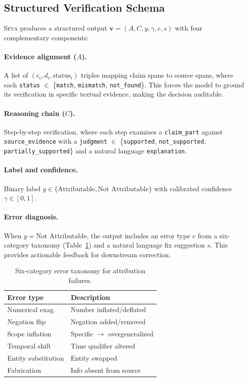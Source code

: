 \documentclass[11pt]{article}
\newcommand{\seva}{\textsc{Seva}\xspace}
\begin{document}
\subsection{Structured Verification Schema}
\label{sec:format}

\seva produces a structured output $\mathbf{v} = (A, C, y, \gamma, e, s)$ with four complementary components:

\paragraph{Evidence alignment ($A$).}
A list of $(c_i, d_i, \text{status}_i)$ triples mapping claim spans to source spans, where each \texttt{status} $\in$ \{\texttt{match}, \texttt{mismatch}, \texttt{not\_found}\}.
This forces the model to ground its verification in specific textual evidence, making the decision auditable.

\paragraph{Reasoning chain ($C$).}
Step-by-step verification, where each step examines a \texttt{claim\_part} against \texttt{source\_evidence} with a \texttt{judgment} $\in$ \{\texttt{supported}, \texttt{not\_supported}, \texttt{partially\_supported}\} and a natural language \texttt{explanation}.

\paragraph{Label and confidence.}
Binary label $y \in \{\text{Attributable}, \text{Not Attributable}\}$ with calibrated confidence $\gamma \in [0,1]$.

\paragraph{Error diagnosis.}
When $y = \text{Not Attributable}$, the output includes an error type $e$ from a six-category taxonomy (Table~\ref{tab:error_taxonomy}) and a natural language fix suggestion $s$.
This provides actionable feedback for downstream correction.

\begin{table}[t]
\centering
\small
\caption{Six-category error taxonomy for attribution failures.}
\label{tab:error_taxonomy}
\vspace{-4pt}
\begin{tabular}{ll}
\toprule
\textbf{Error type} & \textbf{Description} \\
\midrule
Numerical exag. & Number inflated/deflated \\
Negation flip & Negation added/removed \\
Scope inflation & Specific $\to$ overgeneralized \\
Temporal shift & Time qualifier altered \\
Entity substitution & Entity swapped \\
Fabrication & Info absent from source \\
\bottomrule
\end{tabular}
\end{table}
\end{document}
